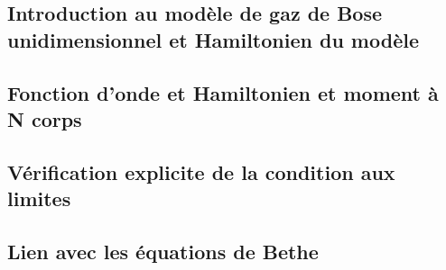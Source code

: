 \subsection{Introduction au modèle de gaz de Bose unidimensionnel et Hamiltonien du modèle}
%



%


%
 
\subsection{Fonction d’onde et Hamiltonien et moment à N corps}
%





%

%

\subsection{Vérification explicite de la condition aux limites}




\subsection{Lien avec les équations de Bethe}
